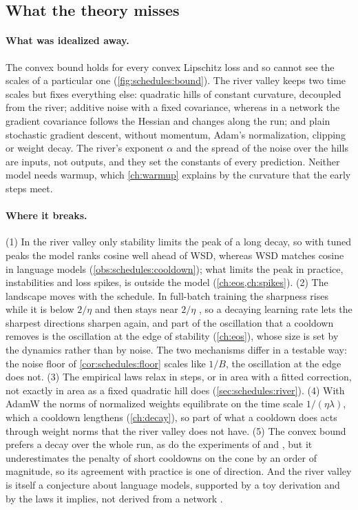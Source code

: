 \begin{refsection}
\section{What the theory misses}\label{sec:schedules:misses}

\paragraph{What was idealized away.} The convex bound holds for every convex Lipschitz loss and so cannot see the scales of a particular one (\cref{fig:schedules:bound}). The river valley keeps two time scales but fixes everything else: quadratic hills of constant curvature, decoupled from the river; additive noise with a fixed covariance, whereas in a network the gradient covariance follows the Hessian and changes along the run; and plain stochastic gradient descent, without momentum, Adam's normalization, clipping or weight decay. The river's exponent $\alpha$ and the spread of the noise over the hills are inputs, not outputs, and they set the constants of every prediction. Neither model needs warmup, which \cref{ch:warmup} explains by the curvature that the early steps meet.

\paragraph{Where it breaks.} (1) In the river valley only stability limits the peak of a long decay, so with tuned peaks the model ranks cosine well ahead of WSD, whereas WSD matches cosine in language models (\cref{obs:schedules:cooldown}); what limits the peak in practice, instabilities and loss spikes, is outside the model (\cref{ch:eos,ch:spikes}). (2) The landscape moves with the schedule. In full-batch training the sharpness rises while it is below $2/\eta$ and then stays near $2/\eta$ \parencite{CohenEtAl2021}, so a decaying learning rate lets the sharpest directions sharpen again, and part of the oscillation that a cooldown removes is the oscillation at the edge of stability (\cref{ch:eos}), whose size is set by the dynamics rather than by noise. The two mechanisms differ in a testable way: the noise floor of \cref{cor:schedules:floor} scales like $1/B$, the oscillation at the edge does not. (3) The empirical laws relax in steps, or in area with a fitted correction, not exactly in area as a fixed quadratic hill does (\cref{sec:schedules:river}). (4) With AdamW the norms of normalized weights equilibrate on the time scale $1/(\eta\lambda)$, which a cooldown lengthens (\cref{ch:decay}), so part of what a cooldown does acts through weight norms that the river valley does not have. (5) The convex bound prefers a decay over the whole run, as do the experiments of \textcite{DefazioEtAl2023} and \textcite{BergsmaEtAl2025}, but it underestimates the penalty of short cooldowns on the cone by an order of magnitude, so its agreement with practice is one of direction. And the river valley is itself a conjecture about language models, supported by a toy derivation and by the laws it implies, not derived from a network \parencite{WenEtAl2025}.


\end{refsection}
